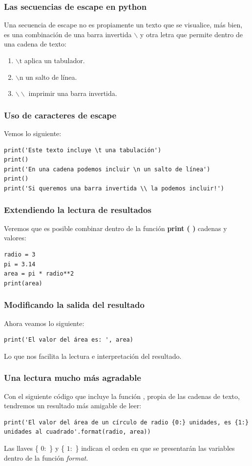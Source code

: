 \documentclass[12pt]{beamer}
\begin{document}
\begin{frame}
\frametitle{Las secuencias de escape en python}
Una secuencia de escape no es propiamente un texto que se visualice, más bien, es una combinación de una barra invertida $\backslash$ y otra letra que permite dentro de una cadena de texto:
\begin{enumerate}[<+->]
\item $\backslash \mbox{t}$ aplica un tabulador.
\item $\backslash \mbox{n}$ un salto de línea.
\item $\backslash \backslash$ imprimir una barra invertida.
\end{enumerate}
\end{frame}
\begin{frame}[fragile]
\frametitle{Uso de caracteres de escape}
Vemos lo siguiente:
\begin{lstlisting}[caption=Algunos caracteres de escape]
print('Este texto incluye \t una tabulación')
print()
print('En una cadena podemos incluir \n un salto de línea')
print()
print('Si queremos una barra invertida \\ la podemos incluir!')
\end{lstlisting}
\end{frame}
\begin{frame}[fragile]
\frametitle{Extendiendo la lectura de resultados}
Veremos que es posible combinar dentro de la función \textbf{print ( )} cadenas y valores:
\pause
\begin{lstlisting}[caption=Combinación de cadenas y valores]
radio = 3
pi = 3.14
area = pi * radio**2
print(area)
\end{lstlisting}
\end{frame}
\begin{frame}[fragile]
\frametitle{Modificando la salida del resultado}
Ahora veamos lo siguiente:
\begin{lstlisting}[caption=Un texto y un valor de salida]
print('El valor del área es: ', area)
\end{lstlisting}
Lo que nos facilita la lectura e interpretación del resultado.
\end{frame}
\begin{frame}[fragile]
\frametitle{Una lectura mucho más agradable}
Con el siguiente código que incluye la función , propia de las cadenas de texto, tendremos un resultado más amigable de leer:
\begin{lstlisting}[caption=Un texto y un valor de salida 2a. versión]
print('El valor del área de un círculo de radio {0:} unidades, es {1:} unidades al cuadrado'.format(radio, area))
\end{lstlisting}
Las llaves \{ $0:$ \} y \{ $1:$ \} indican el orden en que se presentarán las variables dentro de la función \emph{format}.
\end{frame}
\end{document}
